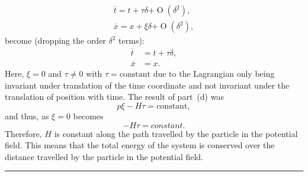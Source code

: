 \begin{align*}
	\overline{t} = t + \tau\delta + \mathrel{O}(\delta^2),\\
	\overline{x} = x + \xi\delta + \mathrel{O}(\delta^2),
\end{align*}
become (dropping the order $\delta^2$ terms):
\begin{align*}
	\overline{t} &= t + \tau\delta,\\
	\overline{x} &= x.
\end{align*}
Here, $\xi=0$ and $\tau \ne 0$ with $\tau=\text{constant}$ due to the Lagrangian only being invariant under translation of the time coordinate and not invariant under the translation of position with time. The result of part~(d) was
\[
	p\xi - H\tau = \text{constant},
\]
and thus, as $\xi=0$ becomes
\[
	-H\tau = constant.
\]
Therefore, $H$ is constant along the path travelled by the particle in the potential field.  This means that the total energy of the system is conserved over the distance travelled by the particle in the potential field.
\par\noindent\rule{\textwidth}{1.5pt}


